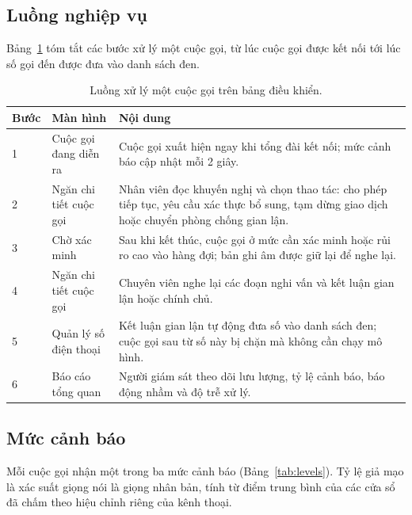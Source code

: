 \documentclass[11pt]{article}
\begin{document}
\subsection{Luồng nghiệp vụ}

Bảng~\ref{tab:flow} tóm tắt các bước xử lý một cuộc gọi, từ lúc cuộc gọi được kết nối tới lúc số gọi đến được đưa vào danh sách đen.

\begin{table}[tbp]
  \centering\small
  \caption{Luồng xử lý một cuộc gọi trên bảng điều khiển.}
  \label{tab:flow}
  \begin{tabularx}{\linewidth}{@{}l>{\raggedright\arraybackslash}p{3.3cm}X@{}}
    \toprule
    \textbf{Bước} & \textbf{Màn hình} & \textbf{Nội dung} \\
    \midrule
    1 & Cuộc gọi đang diễn ra & Cuộc gọi xuất hiện ngay khi tổng đài kết nối; mức cảnh báo cập nhật mỗi 2 giây. \\
    2 & Ngăn chi tiết cuộc gọi & Nhân viên đọc khuyến nghị và chọn thao tác: cho phép tiếp tục, yêu cầu xác thực bổ sung, tạm dừng giao dịch hoặc chuyển phòng chống gian lận. \\
    3 & Chờ xác minh & Sau khi kết thúc, cuộc gọi ở mức cần xác minh hoặc rủi ro cao vào hàng đợi; bản ghi âm được giữ lại để nghe lại. \\
    4 & Ngăn chi tiết cuộc gọi & Chuyên viên nghe lại các đoạn nghi vấn và kết luận gian lận hoặc chính chủ. \\
    5 & Quản lý số điện thoại & Kết luận gian lận tự động đưa số vào danh sách đen; cuộc gọi sau từ số này bị chặn mà không cần chạy mô hình. \\
    6 & Báo cáo tổng quan & Người giám sát theo dõi lưu lượng, tỷ lệ cảnh báo, báo động nhầm và độ trễ xử lý. \\
    \bottomrule
  \end{tabularx}
\end{table}

\subsection{Mức cảnh báo}

Mỗi cuộc gọi nhận một trong ba mức cảnh báo (Bảng~\ref{tab:levels}). Tỷ lệ giả mạo là xác suất giọng nói là giọng nhân bản, tính từ điểm trung bình của các cửa sổ đã chấm theo hiệu chỉnh riêng của kênh thoại.
\end{document}
